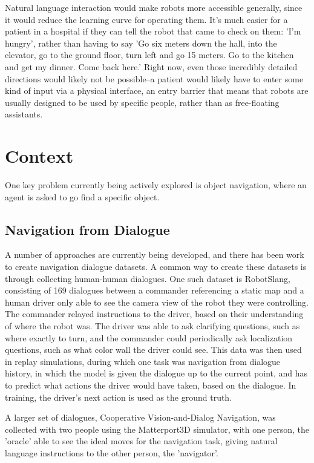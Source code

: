 \documentclass{article}
\begin{document}
Natural language interaction would make robots more accessible generally, since it would reduce the learning curve for operating them. It's much easier for a patient in a hospital if they can tell the robot that came to check on them: 'I'm hungry', rather than having to say 'Go six meters down the hall, into the elevator, go to the ground floor, turn left and go 15 meters. Go to the kitchen and get my dinner. Come back here.' Right now, even those incredibly detailed directions would likely not be possible--a patient would likely have to enter some kind of input via a physical interface, an entry barrier that means that robots are usually designed to be used by specific people, rather than as free-floating assistants.


\section{Context}
One key problem currently being actively explored is object navigation, where an agent is asked to go find a specific object. 

\subsection{Navigation from Dialogue}
A number of approaches are currently being developed, and there has been work to create navigation dialogue datasets. A common way to create these datasets is through collecting human-human dialogues. One such dataset is RobotSlang\cite{robotslang}, consisting of 169 dialogues between a commander referencing a static map and a human driver only able to see the camera view of the robot they were controlling. The commander relayed instructions to the driver, based on their understanding of where the robot was. The driver was able to ask clarifying questions, such as where exactly to turn, and the commander could periodically ask localization questions, such as what color wall the driver could see. This data was then used in replay simulations, during which one task was navigation from dialogue history, in which the model is given the dialogue up to the current point, and has to predict what actions the driver would have taken, based on the dialogue. In training, the driver's next action is used as the ground truth. 

A larger set of dialogues, Cooperative Vision-and-Dialog Navigation, was collected with two people using the Matterport3D simulator, with one person, the 'oracle' able to see the ideal moves for the navigation task, giving natural language instructions to the other person, the 'navigator'\cite{thomason2019visionanddialog}. 
\end{document}
